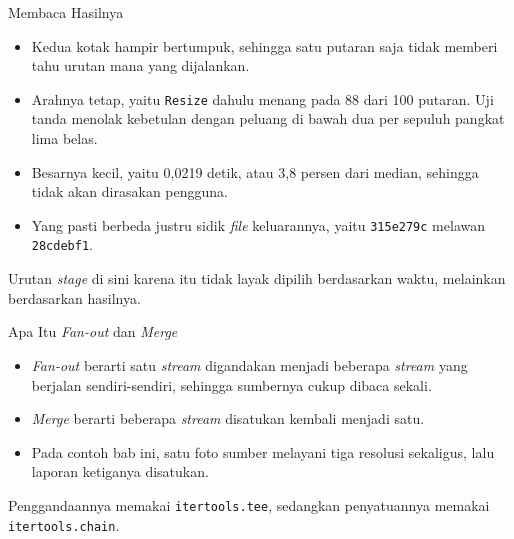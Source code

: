 \documentclass[aspectratio=169, table, 12pt]{beamer}
\begin{document}
\begin{frame}{{\Large Membaca Hasilnya}}
  \vspace{10pt}
  \begin{itemize}\small
    \item Kedua kotak hampir bertumpuk, sehingga satu putaran saja tidak
          memberi tahu urutan mana yang dijalankan.
    \item Arahnya tetap, yaitu \texttt{Resize} dahulu menang pada 88 dari 100
          putaran. Uji tanda menolak kebetulan dengan peluang di bawah dua per
          sepuluh pangkat lima belas.
    \item Besarnya kecil, yaitu 0,0219 detik, atau 3,8 persen dari median,
          sehingga tidak akan dirasakan pengguna.
    \item Yang pasti berbeda justru sidik \textit{file} keluarannya, yaitu
          \texttt{315e279c} melawan \texttt{28cdebf1}.
  \end{itemize}

  \vspace{10pt}
  {\small Urutan \textit{stage} di sini karena itu tidak layak dipilih
  berdasarkan waktu, melainkan berdasarkan hasilnya.}
\end{frame}

\begin{frame}{{\Large Apa Itu \textit{Fan-out} dan \textit{Merge}}}
  \vspace{10pt}
  \begin{itemize}\small
    \item \textit{Fan-out} berarti satu \textit{stream} digandakan menjadi
          beberapa \textit{stream} yang berjalan sendiri-sendiri, sehingga
          sumbernya cukup dibaca sekali.
    \item \textit{Merge} berarti beberapa \textit{stream} disatukan kembali
          menjadi satu.
    \item Pada contoh bab ini, satu foto sumber melayani tiga resolusi
          sekaligus, lalu laporan ketiganya disatukan.
  \end{itemize}

  \vspace{10pt}
  {\small Penggandaannya memakai \texttt{itertools.tee}, sedangkan
  penyatuannya memakai \texttt{itertools.chain}.}
\end{frame}
\end{document}
